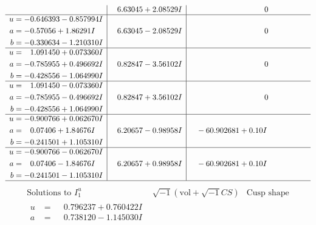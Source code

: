 \documentclass[1p]{elsarticle_modified}
\theoremstyle{definition}
\newcommand{\I}{\sqrt{-1}}
\begin{document}
$$\begin{array}{c|c|c}
 & \phantom{-}6.63045 + 2.08529 I & \phantom{-0.000000 } 0 \\ \hline\begin{aligned}
u &= -0.646393 - 0.857994 I \\
a &= -0.57056 + 1.86291 I \\
b &= -0.330634 - 1.210310 I\end{aligned}
 & \phantom{-}6.63045 - 2.08529 I & \phantom{-0.000000 } 0 \\ \hline\begin{aligned}
u &= \phantom{-}1.091450 + 0.073360 I \\
a &= -0.785955 + 0.496692 I \\
b &= -0.428556 - 1.064990 I\end{aligned}
 & \phantom{-}0.82847 - 3.56102 I & \phantom{-0.000000 } 0 \\ \hline\begin{aligned}
u &= \phantom{-}1.091450 - 0.073360 I \\
a &= -0.785955 - 0.496692 I \\
b &= -0.428556 + 1.064990 I\end{aligned}
 & \phantom{-}0.82847 + 3.56102 I & \phantom{-0.000000 } 0 \\ \hline\begin{aligned}
u &= -0.900766 + 0.062670 I \\
a &= \phantom{-}0.07406 + 1.84676 I \\
b &= -0.241501 + 1.105310 I\end{aligned}
 & \phantom{-}6.20657 - 0.98958 I & \phantom{-}                -6
0.902681 + 0. 10   I\phantom{ +0.000000I} \\ \hline\begin{aligned}
u &= -0.900766 - 0.062670 I \\
a &= \phantom{-}0.07406 - 1.84676 I \\
b &= -0.241501 - 1.105310 I\end{aligned}
 & \phantom{-}6.20657 + 0.98958 I & \phantom{-}                -6
0.902681 + 0. 10   I\phantom{ +0.000000I}\\
 \hline 
 \end{array}$$\newpage$$\begin{array}{c|c|c}  
\text{Solutions to }I^u_{1}& \I (\text{vol} + \sqrt{-1}CS) & \text{Cusp shape}\\
 \hline 
\begin{aligned}
u &= \phantom{-}0.796237 + 0.760422 I \\
a &= \phantom{-}0.738120 - 1.145030 I \\

\end{aligned}
\end{array}$$
\end{document}
